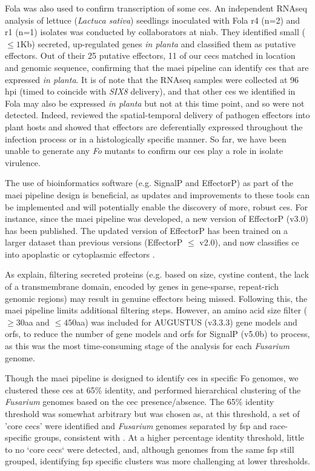 \ac{Fola} was also used to confirm transcription of some \acp{ce}. An independent RNAseq analysis of lettuce (\textit{Lactuca sativa}) seedlings inoculated with \ac{Fola} \ac{r4} (n=2) and \ac{r1} (n=1) isolates was conducted by collaborators at \ac{niab}. They identified small ($\le1$Kb) secreted, up-regulated genes \textit{in planta} and classified them as putative effectors. Out of their 25 putative effectors, 11 of our \acp{cec} matched in location and genomic sequence, confirming that the \ac{maei} pipeline can identify \acp{ce} that are expressed \textit{in planta}. It is of note that the RNAseq samples were collected at 96 \ac{hpi} (timed to coincide with \textit{SIX8} delivery), and that other \acp{ce} we identified in \ac{Fola} may also be expressed \textit{in planta} but not at this time point, and so were not detected.  Indeed, \textcite{Toruno2016} reviewed the spatial-temporal delivery of pathogen effectors into plant hosts and showed that effectors are deferentially expressed throughout the infection process or in a histologically specific manner. So far, we have been unable to generate any \textit{Fo} mutants to confirm our \acp{ce} play a role in isolate virulence. 

The use of bioinformatics software (e.g. SignalP and EffectorP) as part of the \ac{maei} pipeline design is beneficial, as updates and improvements to these tools can be implemented and will potentially enable the discovery of more, robust \acp{ce}. For instance, since the \ac{maei} pipeline was developed, a new version of EffectorP (v3.0) has been published. The updated version of EffectorP has been trained on a larger dataset than previous versions (EffectorP $\le$ v2.0), and now classifies \acl{ce} into apoplastic or cytoplasmic effectors \parencite{Sperschneider2022}.  

As \textcite{LoPresti2015, Sperschneider2015} explain, filtering secreted proteins (e.g. based on size, cystine content, the lack of a transmembrane domain, encoded by genes in gene-sparse, repeat-rich genomic regions) may result in genuine effectors being missed. Following this, the \ac{maei} pipeline limits additional filtering steps. However, an amino acid size filter ($\geq30$aa and $\leq450$aa) was included for AUGUSTUS (v3.3.3) gene models and \acp{orf}, to reduce the number of gene models and \acp{orf} for SignalP (v5.0b) to process, as this was the most time-consuming stage of the analysis for each \textit{Fusarium} genome. 

Though the \ac{maei} pipeline is designed to identify \acp{ce} in specific \ac{Fo} genomes, we clustered these \acp{ce} at 65\% identity, and performed hierarchical clustering of the \textit{Fusarium} genomes based on the \ac{cec} presence/absence. The 65\% identity threshold was somewhat arbitrary but was chosen as, at this threshold, a set of 'core  \acp{cec}' were identified and \textit{Fusarium} genomes separated by \ac{fsp} and race-specific groups, consistent with \textcite{Dam2016,FoEC2}. At a higher percentage identity threshold, little to no `core \acp{cec}` were detected, and, although genomes from the same \ac{fsp} still grouped, identifying \ac{fsp} specific clusters was more challenging at lower thresholds. 

